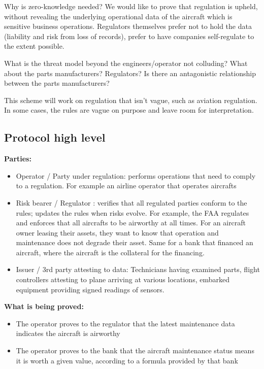 Why is zero-knowledge needed? We would like to prove that regulation is upheld, without revealing the underlying operational data of the aircraft which is sensitive business operations. 
Regulators themselves prefer not to hold the data (liability and risk from loss of records), prefer to have companies self-regulate to the extent possible. 

What is the threat model beyond the engineers/operator not colluding?  What about the parts manufacturers?  Regulators?  Is there an antagonistic relationship between the parts manufacturers?

This scheme will work on regulation that isn't vague, such as aviation regulation. In some cases, the rules are vague on purpose and leave room for interpretation.


\subsection{Protocol high level}
\label{apps:regulation-compliance:protocol-high-level}

\textbf{Parties:} 
\begin{itemize}
    \item Operator / Party under regulation: performs operations that need to comply to a regulation. For example an airline operator that operates aircrafts
    \item Risk bearer / Regulator : verifies that all regulated parties conform to the rules; updates the rules when risks evolve. For example, the FAA regulates and enforces that all aircrafts to be airworthy at all times. For an aircraft owner leasing their assets, they want to know that operation and maintenance does not degrade their asset. Same for a bank that financed an aircraft, where the aircraft is the collateral for the financing.  
    \item Issuer / 3rd party attesting to data: Technicians having examined parts, flight controllers attesting to plane arriving at various locations, embarked equipment providing signed readings of sensors.
\end{itemize}

\textbf{What is being proved:}
\begin{itemize}
    \item The operator proves to the regulator that the latest maintenance data indicates the aircraft is airworthy
    \item The operator proves to the bank that the aircraft maintenance status means it is worth a given value, according to a formula provided by that bank
\end{itemize}

